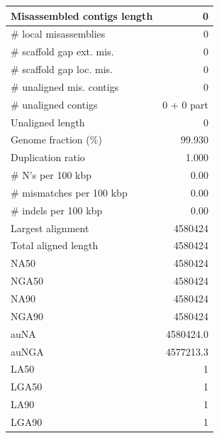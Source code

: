 \documentclass[12pt,a4paper]{article}
\begin{document}
\begin{table}[ht]
\begin{center}
\begin{tabular}{|l*{1}{|r}|}
Misassembled contigs length & 0 \\ \hline
\# local misassemblies & 0 \\ \hline
\# scaffold gap ext. mis. & 0 \\ \hline
\# scaffold gap loc. mis. & 0 \\ \hline
\# unaligned mis. contigs & 0 \\ \hline
\# unaligned contigs & 0 + 0 part \\ \hline
Unaligned length & 0 \\ \hline
Genome fraction (\%) & 99.930 \\ \hline
Duplication ratio & 1.000 \\ \hline
\# N's per 100 kbp & 0.00 \\ \hline
\# mismatches per 100 kbp & 0.00 \\ \hline
\# indels per 100 kbp & 0.00 \\ \hline
Largest alignment & 4580424 \\ \hline
Total aligned length & 4580424 \\ \hline
NA50 & 4580424 \\ \hline
NGA50 & 4580424 \\ \hline
NA90 & 4580424 \\ \hline
NGA90 & 4580424 \\ \hline
auNA & 4580424.0 \\ \hline
auNGA & 4577213.3 \\ \hline
LA50 & 1 \\ \hline
LGA50 & 1 \\ \hline
LA90 & 1 \\ \hline
LGA90 & 1 \\ \hline
\end{tabular}
\end{center}
\end{table}
\end{document}
